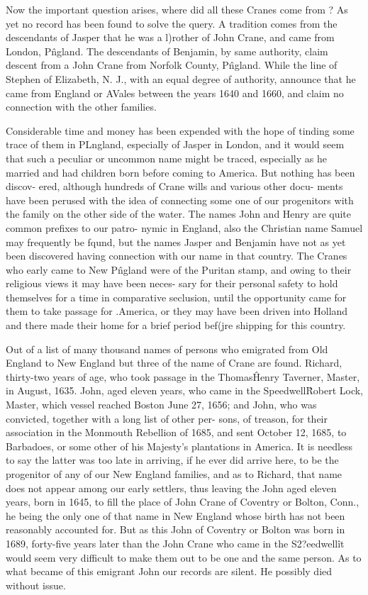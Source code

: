 \documentclass{book}
\begin{document}
Now the important question arises, where did all these Cranes 
come from ? As yet no record has been found to solve the query. 
A tradition comes from the descendants of Jasper that he was a 
l)rother of John Crane, and came from London, P\^ngland. The 
descendants of Benjamin, by same authority, claim descent from 
a John Crane from Norfolk County, P\^ngland. While the line of 
Stephen of Elizabeth, N. J., with an equal degree of authority, 
announce that he came from England or AVales between the years 
1640 and 1660, and claim no connection with the other families. 




Considerable time and money has been expended with the hope 
of tinding some trace of them in PLngland, especially of Jasper in 
London, and it would seem that such a peculiar or uncommon 
name might be traced, especially as he married and had children 
born before coming to America. But nothing has been discov- 
ered, although hundreds of Crane wills and various other docu- 
ments have been perused with the idea of connecting some one of 
our progenitors with the family on the other side of the water. 
The names John and Henry are quite common prefixes to our patro- 
nymic in England, also the Christian name Samuel may frequently 
be fqund, but the names Jasper and Benjamin have not as yet 
been discovered having connection with our name in that country. 
The Cranes who early came to New P\^ngland were of the Puritan 
stamp, and owing to their religious views it may have been neces- 
sary for their personal safety to hold themselves for a time in 
comparative seclusion, until the opportunity came for them to 
take passage for .America, or they may have been driven into 
Holland and there made their home for a brief period bef(jre 
shipping for this country. 

Out of a list of many thousand names of persons who emigrated 
from Old England to New England but three of the name of 
Crane are found. Richard, thirty-two years of age, who took 
passage in the Thomas\^ Henry Taverner, Master, in August, 1635. 
John, aged eleven years, who came in the Speedwell\^ Robert 
Lock, Master, which vessel reached Boston June 27, 1656; and 
John, who was convicted, together with a long list of other per- 
sons, of treason, for their association in the Monmouth Rebellion 
of 1685, and sent October 12, 1685, to Barbadoes, or some other 
of his Majesty's plantations in America. It is needless to say the 
latter was too late in arriving, if he ever did arrive here, to be 
the progenitor of any of our New England families, and as to 
Richard, that name does not appear among our early settlers, 
thus leaving the John aged eleven years, born in 1645, to fill the 
place of John Crane of Coventry or Bolton, Conn., he being the 
only one of that name in New England whose birth has not been 
reasonably accounted for. But as this John of Coventry or 
Bolton was born in 1689, forty-five years later than the John 
Crane who came in the S2?eedwell\^ it would seem very difficult to 
make them out to be one and the same person. As to what 
became of this emigrant John our records are silent. He possibly 
died without issue. 
\end{document}
